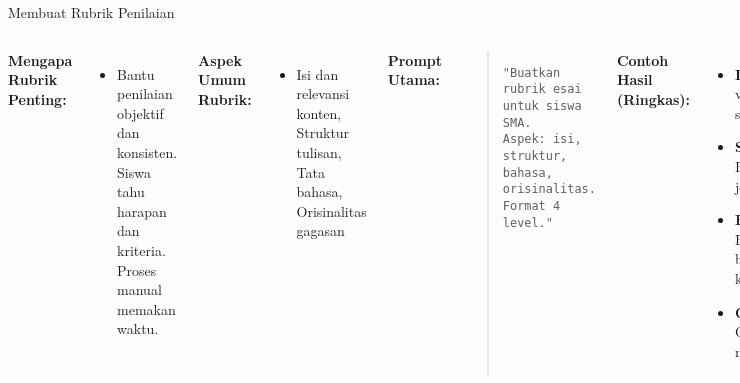 \documentclass[aspectratio=169, table]{beamer}
\begin{document}
\begin{frame}[fragile]{Membuat Rubrik Penilaian}
	\vspace{20pt}
	\small
	\begin{columns}[T]
		\textbf{Mengapa Rubrik Penting:}
		\begin{itemize}
			\item Bantu penilaian objektif dan konsisten. Siswa tahu harapan dan kriteria. Proses manual memakan waktu.
		\end{itemize}
		
		\textbf{Aspek Umum Rubrik:}
		\begin{itemize}
			\item Isi dan relevansi konten, Struktur tulisan, Tata bahasa, Orisinalitas gagasan
		\end{itemize}
		
		\textbf{Prompt Utama:}
		\begin{quote}
			\centering
			\texttt{"Buatkan rubrik esai untuk siswa SMA.\\Aspek: isi, struktur, bahasa, orisinalitas.\\Format 4 level."}
		\end{quote}
		
		\textbf{Contoh Hasil (Ringkas):}
		\begin{itemize}
			\item \textbf{Isi:} Lengkap vs tidak sesuai topik
			\item \textbf{Struktur:} Rapi vs tidak jelas
			\item \textbf{Bahasa:} Baku vs banyak kesalahan
			\item \textbf{Orisinalitas:} Orisinal vs menyalin
		\end{itemize}
		
		\textbf{Prompt Alternatif SD:}
		\begin{quote}
			\centering
			\texttt{"Buat rubrik presentasi kelas 5 SD.\\Aspek: kejelasan, gambar, kerja sama."}
		\end{quote}
		
		\textbf{Manfaat:} Cepat dan mudah disesuaikan, Tetap bisa disunting guru
	\end{columns}
\end{frame}
\end{document}
